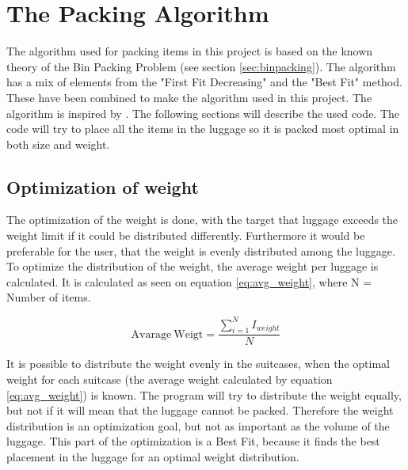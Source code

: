 \section{The Packing Algorithm}
\label{sec:algorithm}
The algorithm used for packing items in this project is based on the known theory of the Bin Packing Problem (see section \ref{sec:binpacking}). The algorithm has a mix of elements from the "First Fit Decreasing" and the "Best Fit" method. These have been combined to make the algorithm used in this project. The algorithm is inspired by \citet{three-dim-pack}. The following sections will describe the used code.
The code will try to place all the items in the luggage so it is packed most optimal in both size and weight.

\subsection{Optimization of weight}
The optimization of the weight is done, with the target that luggage exceeds the weight limit if it could be distributed differently. Furthermore it would be preferable for the user, that the weight is evenly distributed among the luggage.
To optimize the distribution of the weight, the average weight per luggage is calculated. It is calculated as seen on equation \ref{eq:avg_weight}, where N = Number of items.

\begin{equation}
	\label{eq:avg_weight}
	\mathrm{Avarage~Weigt} = \frac{\displaystyle\sum_{i=1}^{N} I_{weight}}{N}
\end{equation}

It is possible to distribute the weight evenly in the suitcases, when the optimal weight for each suitcase (the average weight calculated by equation \ref{eq:avg_weight}) is known. The program will try to distribute the weight equally, but not if it will mean that the luggage cannot be packed. Therefore the weight distribution is an optimization goal, but not as important as the volume of the luggage. This part of the optimization is a Best Fit, because it finds the best placement in the luggage for an optimal weight distribution.

